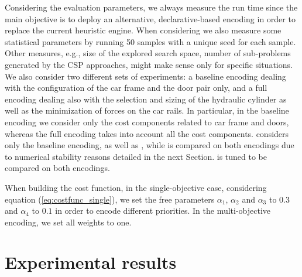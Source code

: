 Considering the evaluation parameters, we always measure the run time
since the main objective is to deploy an alternative, declarative-based
encoding in order to replace the current heuristic engine. When considering
\liftcreatega{} we also measure some statistical parameters by running
50 samples with a unique seed for each sample. Other measures, e.g.,
size of the explored search space, number of sub-problems generated by the
CSP approaches, might make sense only for specific situations. We also
consider two different sets of experiments: a baseline encoding dealing with
the configuration of the car frame and the door pair only,
and a full encoding dealing also with the selection and sizing of the
hydraulic cylinder as well as the minimization of forces on the car
rails. In particular, in the baseline encoding we consider only the
cost components related to car frame and doors, whereas the full
encoding takes into account all the cost components. \liftcreatega{}
considers only the baseline encoding, as well as \liftcreatecp{}, while
\liftcreatesmt{} is compared on both encodings due to numerical stability
reasons detailed in the next Section. \liftcreatehr{} is tuned to be
compared on both encodings.

When building the cost function, in the single-objective case, considering 
equation (\ref{eq:costfunc_single}), we set the free parameters $\alpha_1$, 
$\alpha_2$ and $\alpha_3$ to $0.3$ and $\alpha_4$ to $0.1$ in order to encode 
different priorities. In the multi-objective encoding, we set all weights to one. 

\section{Experimental results}
%
